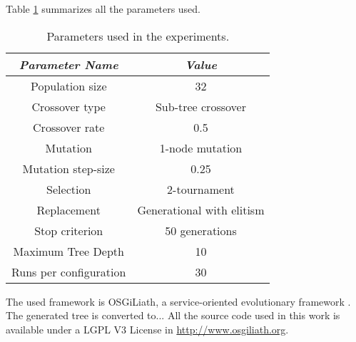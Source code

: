 \documentclass[runningheads,a4paper]{llncs}
\begin{document}
Table \ref{tab:parameters} summarizes all the parameters used.

\begin{table}
\begin{center}
\begin{tabular}{|c|c|}
\hline
{\em Parameter Name} & {\em Value} \\\hline
Population size & 32 \\\hline
Crossover type & Sub-tree crossover \\ \hline
Crossover rate & 0.5\\ \hline
Mutation  & 1-node mutation\\ \hline
Mutation step-size & 0.25 \\ \hline
Selection & 2-tournament \\ \hline
Replacement & Generational with elitism\\ \hline
Stop criterion & 50 generations \\ \hline
Maximum Tree Depth & 10 \\ \hline %
Runs per configuration & 30 \\ \hline
\end{tabular}
\caption{Parameters used in the experiments.}
\label{tab:parameters}
\end{center}
\end{table}

The used framework is OSGiLiath, a service-oriented evolutionary framework \cite{Garcia13Service}. The generated tree is converted to...  All the source code used in this work is available under a LGPL V3 License in \url{http://www.osgiliath.org}.




\end{document}
